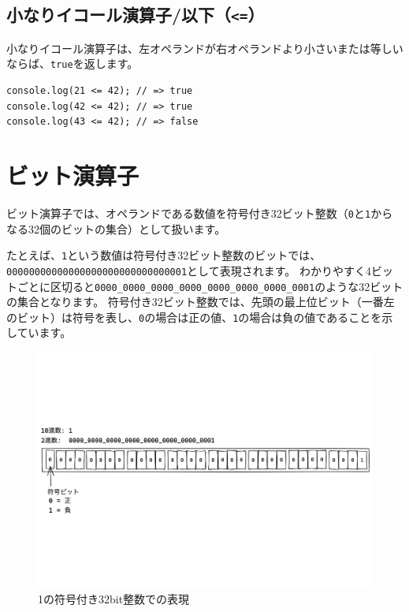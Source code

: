 \hypertarget{less-than-equal}{%
\subsection{\texorpdfstring{小なりイコール演算子/以下（\texttt{\textless{}=}）}{小なりイコール演算子/以下（\textless{}=）}}\label{less-than-equal}}

小なりイコール演算子は、左オペランドが右オペランドより小さいまたは等しいならば、\texttt{true}を返します。

\begin{lstlisting}
console.log(21 <= 42); // => true
console.log(42 <= 42); // => true
console.log(43 <= 42); // => false
\end{lstlisting}

\hypertarget{bit-operator}{%
\section{ビット演算子}\label{bit-operator}}

ビット演算子では、オペランドである数値を符号付き32ビット整数（\texttt{0}と\texttt{1}からなる32個のビットの集合）として扱います。

たとえば、\texttt{1}という数値は符号付き32ビット整数のビットでは、\texttt{00000000000000000000000000000001}として表現されます。
わかりやすく4ビットごとに区切ると\texttt{0000\_0000\_0000\_0000\_0000\_0000\_0000\_0001}のような32ビットの集合となります。
符号付き32ビット整数では、先頭の最上位ビット（一番左のビット）は符号を表し、\texttt{0}の場合は正の値、\texttt{1}の場合は負の値であることを示しています。

\begin{figure}[h]
\centering
\includegraphics[width=130mm]{fig/0001.pdf}
\caption{1の符号付き32bit整数での表現}
\end{figure}

